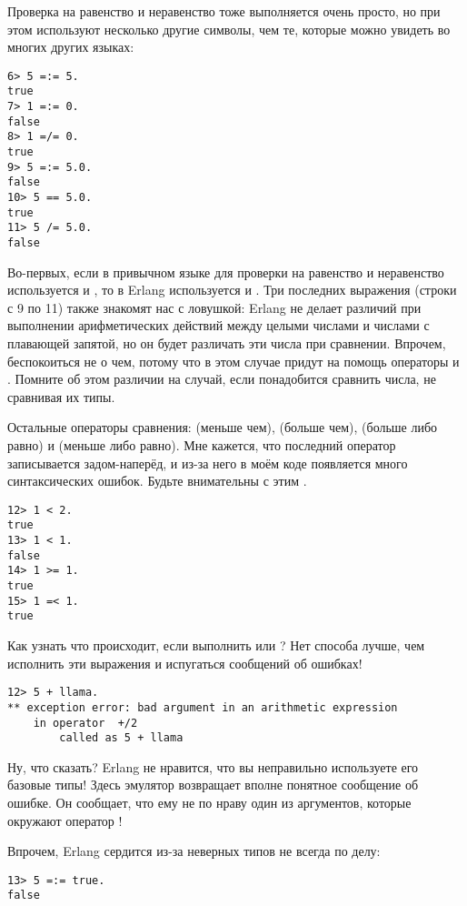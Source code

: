 Проверка на равенство и неравенство тоже выполняется очень просто, но при этом используют несколько другие символы, чем те, которые можно увидеть во многих других языках:
\begin{lstlisting}[style=repl]
6> 5 =:= 5.
true
7> 1 =:= 0.
false
8> 1 =/= 0.
true
9> 5 =:= 5.0.
false
10> 5 == 5.0.
true
11> 5 /= 5.0.
false
\end{lstlisting}

Во\--первых, если в привычном языке для проверки на равенство и неравенство используется \ops{==} и \ops{!=}, то в Erlang используется \ops{=:=} и \ops{=/=}.
Три последних выражения (строки с 9 по 11) также знакомят нас с ловушкой: Erlang не делает различий при выполнении арифметических действий между целыми числами и числами с плавающей запятой, но он будет различать эти числа при сравнении.
Впрочем, беспокоиться не о чем, потому что в этом случае придут на помощь операторы \ops{==} и \ops{/=}.
Помните об этом различии на случай, если понадобится сравнить числа, не сравнивая их типы.

Остальные операторы сравнения: \ops{$<$} (меньше чем), \ops{$>$} (больше чем), \ops{$>=$} (больше либо равно) и \ops{$=<$} (меньше либо равно).
Мне кажется, что последний оператор записывается задом\--наперёд, и из\--за него в моём коде появляется много синтаксических ошибок.
Будьте внимательны с этим \ops{$=<$}.
\begin{lstlisting}[style=repl]
12> 1 < 2.
true
13> 1 < 1.
false
14> 1 >= 1.
true
15> 1 =< 1.
true
\end{lstlisting}

Как узнать что происходит, если выполнить  или ?
Нет способа лучше, чем исполнить эти выражения и испугаться сообщений об ошибках!
\begin{lstlisting}[style=repl]
12> 5 + llama.
** exception error: bad argument in an arithmetic expression
    in operator  +/2
        called as 5 + llama
\end{lstlisting}

Ну, что сказать?
Erlang не нравится, что вы неправильно используете его базовые типы!
Здесь эмулятор возвращает вполне понятное сообщение об ошибке.
Он сообщает, что ему не по нраву один из аргументов, которые окружают оператор \ops{+}!

Впрочем, Erlang сердится из\--за неверных типов не всегда по делу:
\begin{lstlisting}[style=repl]
13> 5 =:= true.
false
\end{lstlisting}

